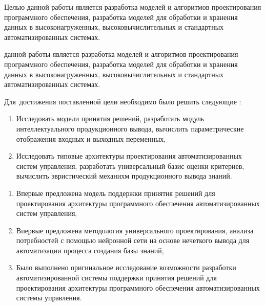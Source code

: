 Целью данной работы является разработка моделей и алгоритмов проектирования программного обеспечения, разработка моделей для обработки и хранения данных в высоконагруженных, высоковычислительных и стандартных автоматизированных системах.
\else


\fi


{\aim} данной работы является  разработка моделей и алгоритмов проектирования программного обеспечения, разработка моделей для обработки и хранения данных в высоконагруженных, высоковычислительных и стандартных автоматизированных системах.

Для~достижения поставленной цели необходимо было решить следующие {\tasks}:
\begin{enumerate}[beginpenalty=10000] %
  \item Исследовать модели принятия решений, разработать модуль интеллектуального продукционного вывода, вычислить параметрические отображения входных и выходных переменных,
  \item Исследовать типовые архитектуры проектирования автоматизированных систем управления, разработать универсальный базис оценки критериев, вычислить эвристический механихм продукционного вывода знаний.
\end{enumerate}


{\novelty}
\begin{enumerate}[beginpenalty=10000] %
  \item Впервые предложена модель поддержки принятия решений для проектирования архитектуры программного обеспечения автоматизированных систем управления,
  \item Впервые предложена методология универсального проектирования, анализа потребностей с помощью нейронной сети на основе нечеткого вывода для автоматизации процесса создания базы знаний,
  \item Было выполнено оригинальное исследование возможности разработки автоматизированной системы поддержки принятия решений для проектирования архитектуры программного обеспечения автоматизированных системы управления.
\end{enumerate}



